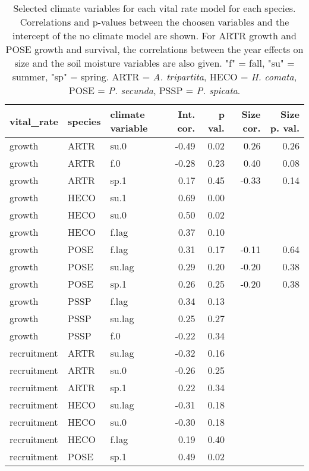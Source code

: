 \begin{table}[ht]
\centering
\caption{Selected climate variables for each vital rate model for each species. Correlations and p-values between the choosen variables and the intercept of the no climate model are shown. For ARTR growth and POSE growth and survival, the correlations between the year effects on size and the soil moisture variables are also given. "f" = fall, "su" = summer, "sp" = spring. ARTR = \textit{A. tripartita}, HECO = \textit{H. comata}, POSE = \textit{P. secunda}, PSSP = \textit{P. spicata}.} 
\label{table:strongCor}
\begin{tabular}{lllrrrr}
  \hline
vital\_rate & species & climate variable & Int. cor. & p val. & Size cor. & Size p. val. \\ 
  \hline
growth & ARTR & su.0 & -0.49 & 0.02 & 0.26 & 0.26 \\ 
  growth & ARTR & f.0 & -0.28 & 0.23 & 0.40 & 0.08 \\ 
  growth & ARTR & sp.1 & 0.17 & 0.45 & -0.33 & 0.14 \\ 
  growth & HECO & su.1 & 0.69 & 0.00 &  &  \\ 
  growth & HECO & su.0 & 0.50 & 0.02 &  &  \\ 
  growth & HECO & f.lag & 0.37 & 0.10 &  &  \\ 
  growth & POSE & f.lag & 0.31 & 0.17 & -0.11 & 0.64 \\ 
  growth & POSE & su.lag & 0.29 & 0.20 & -0.20 & 0.38 \\ 
  growth & POSE & sp.1 & 0.26 & 0.25 & -0.20 & 0.38 \\ 
  growth & PSSP & f.lag & 0.34 & 0.13 &  &  \\ 
  growth & PSSP & su.lag & 0.25 & 0.27 &  &  \\ 
  growth & PSSP & f.0 & -0.22 & 0.34 &  &  \\ 
  recruitment & ARTR & su.lag & -0.32 & 0.16 &  &  \\ 
  recruitment & ARTR & su.0 & -0.26 & 0.25 &  &  \\ 
  recruitment & ARTR & sp.1 & 0.22 & 0.34 &  &  \\ 
  recruitment & HECO & su.lag & -0.31 & 0.18 &  &  \\ 
  recruitment & HECO & su.0 & -0.30 & 0.18 &  &  \\ 
  recruitment & HECO & f.lag & 0.19 & 0.40 &  &  \\ 
  recruitment & POSE & sp.1 & 0.49 & 0.02 &  &  \\ 

\end{tabular}
\end{table}
